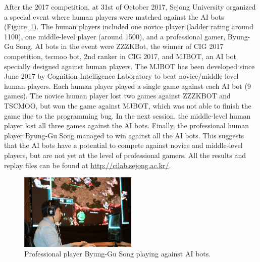After the 2017 competition, at 31st of October 2017, Sejong University organized a special event where human players were matched against the AI bots (Figure~\ref{figureSong}). The human players included one novice player (ladder rating around 1100), one middle-level player (around 1500), and a professional gamer, Byung-Gu Song. AI bots in the event were ZZZKBot, the winner of CIG 2017 competition, tscmoo bot, 2nd ranker in CIG 2017, and MJBOT, an AI bot specially designed against human players. The MJBOT has been developed since June 2017 by Cognition Intelligence Laboratory  to beat novice/middle-level human players. 
Each human player played a single game against each AI bot (9 games). 
The novice human player lost two games against ZZZKBOT and TSCMOO, but won the game against MJBOT, which was not able to finish the game due to the programming bug. In the next session, the middle-level human player lost all three games against the AI bots. Finally, the professional human player Byung-Gu Song managed to win against all the AI bots. This suggests that the AI bots have a potential to compete against novice and middle-level players, but are not yet at the level of professional gamers. All the results and replay files can be found at {\url{http://cilab.sejong.ac.kr/}}. 

\begin{figure}[h]
  \centering
  \includegraphics[width=0.5\textwidth]{fig/song_human_ai.png}
  \caption{Professional player Byung-Gu Song playing against AI bots.}
  \label{figureSong}
\end{figure} 
